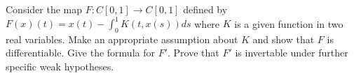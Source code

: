 Consider the map $F:C[0,1]\rightarrow C[0,1]$ defined by
$F(x)(t)=x(t)-\int_0^1K(t,x(s))ds$ where $K$ is a given function in
two real variables. Make an appropriate assumption about $K$ and show
that $F$ is differentiable. Give the formula for $F'$. Prove that $F'$
is invertable under further specific weak hypotheses.
